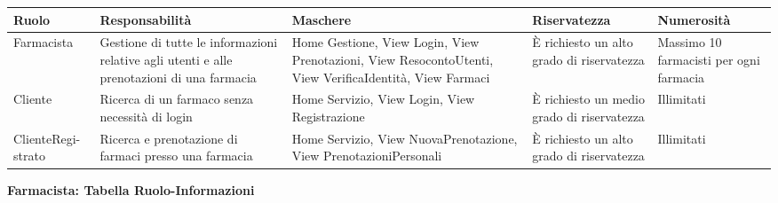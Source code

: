 \begin{tabular} {|P{2.5cm}|P{3cm}|P{4cm}|P{3cm}|P{2.5cm}|}
    \hline
    \textbf{Ruolo}                                                          & \textbf{Responsabilità}                                       & \textbf{Maschere} & \textbf{Riservatezza} & \textbf{Numerosità} \\
    \hline
    Farmacista                                                              & Gestione di tutte le informazioni relative agli utenti e alle
    prenotazioni di una farmacia                                            & Home Gestione, View Login, View
    Prenotazioni, View ResocontoUtenti, View VerificaIdentità, View Farmaci &
    È richiesto un alto grado di riservatezza                               & Massimo 10 farmacisti per ogni
    farmacia                                                                                                                                                                                                  \\
    \hline
    Cliente                                                                 & Ricerca di un farmaco senza necessità di login                & Home Servizio,
    View Login, View Registrazione                                          & È richiesto un medio grado di
    riservatezza                                                            & Illimitati                                                                                                                      \\
    \hline
    ClienteRegi-\linebreak strato                                           & Ricerca e prenotazione di farmaci presso una farmacia
                                                                            & Home Servizio, View NuovaPrenotazione, View
    PrenotazioniPersonali                                                   & È richiesto un alto grado di riservatezza                     &
    Illimitati                                                                                                                                                                                                \\
    \hline
\end{tabular}
\hfill \break
\hfill \break

\textbf{Farmacista: Tabella Ruolo-Informazioni}
\hfill \break

